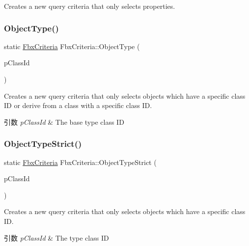 Creates a new query criteria that only selects properties. 

\mbox{\label{class_fbx_criteria_a760d66022a8febcd3fd0c5fbbb534023}} 
\subsubsection{\texorpdfstring{Object\+Type()}{ObjectType()}}
{\footnotesize\ttfamily static \hyperlink{class_fbx_criteria}{Fbx\+Criteria} Fbx\+Criteria\+::\+Object\+Type (\begin{DoxyParamCaption}\item[{const \hyperlink{class_fbx_class_id}{Fbx\+Class\+Id} \&}]{p\+Class\+Id }\end{DoxyParamCaption})\hspace{0.3cm}{\ttfamily [static]}}

Creates a new query criteria that only selects objects which have a specific class ID or derive from a class with a specific class ID. 
\begin{DoxyParams}{引数}
{\em p\+Class\+Id} & The base type class ID \\
\hline
\end{DoxyParams}
\mbox{\label{class_fbx_criteria_a38bc13d95aaea852252625ca084054dd}} 
\subsubsection{\texorpdfstring{Object\+Type\+Strict()}{ObjectTypeStrict()}}
{\footnotesize\ttfamily static \hyperlink{class_fbx_criteria}{Fbx\+Criteria} Fbx\+Criteria\+::\+Object\+Type\+Strict (\begin{DoxyParamCaption}\item[{const \hyperlink{class_fbx_class_id}{Fbx\+Class\+Id} \&}]{p\+Class\+Id }\end{DoxyParamCaption})\hspace{0.3cm}{\ttfamily [static]}}

Creates a new query criteria that only selects objects which have a specific class ID. 
\begin{DoxyParams}{引数}
{\em p\+Class\+Id} & The type class ID \\
\hline
\end{DoxyParams}
\mbox{\label{class_fbx_criteria_a413bfdd843fa25e6ff94f942b25114f9}} 

